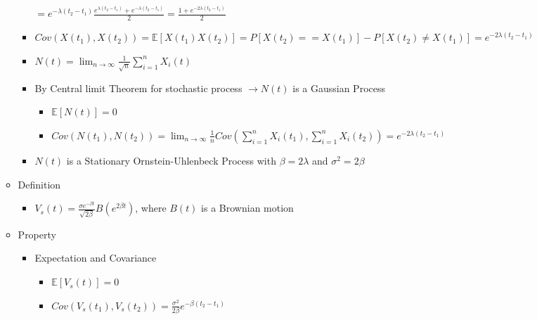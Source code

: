 \documentclass[a4paper]{article}
\begin{document}
\begin{itemize}
\begin{itemize}
\begin{itemize}
                        $= e^{-\lambda (t_2 - t_1)}\frac{e^{\lambda (t_2 - t_1)} + e^{-\lambda (t_2 - t_1)}}{2} = \frac{1 + e^{-2\lambda (t_2 - t_1)}}{2}$
                    \item $\mathit{Cov}(X(t_1), X(t_2)) = \mathbb{E}[X(t_1)X(t_2)] = P[X(t_2) == X(t_1)] - P[X(t_2) \not = X(t_1)] = e^{-2\lambda (t_2 - t_1)}$
                    \item $N(t) = \lim_{n \rightarrow \infty} \frac{1}{\sqrt{n}} \sum_{i=1}^n X_i(t)$
                    \item By Central limit Theorem for stochastic process $\rightarrow N(t)$ is a Gaussian Process
                        \begin{itemize}
                            \item $\mathbb{E}[N(t)] = 0$
                            \item $\mathit{Cov}(N(t_1), N(t_2)) = \lim_{n \rightarrow \infty} \frac{1}{n} \mathit{Cov}(\sum_{i=1}^n X_i(t_1), \sum_{i=1}^n X_i(t_2)) = e^{-2\lambda (t_2 - t_1)}$
                        \end{itemize}
                    \item $N(t)$ is a Stationary Ornstein-Uhlenbeck Process with $\beta = 2 \lambda$ and $\sigma^2 = 2 \beta$
                \end{itemize}
            \item Definition
                \begin{itemize}
                    \item $V_s(t) = \frac{\sigma e^{-\beta t}}{\sqrt{2\beta }} B(e^{2\beta t})$, where $B(t)$ is a Brownian motion
                \end{itemize}
            \item Property
                \begin{itemize}
                    \item Expectation and Covariance
                        \begin{itemize}
                            \item $\mathbb{E}[V_s(t)] = 0$
                            \item $\mathit{Cov}(V_s(t_1), V_s(t_2)) = \frac{\sigma^2}{2\beta} e^{-\beta(t_2 - t_1)}$


\end{itemize}
\end{itemize}
\end{itemize}
\end{itemize}
\end{document}
